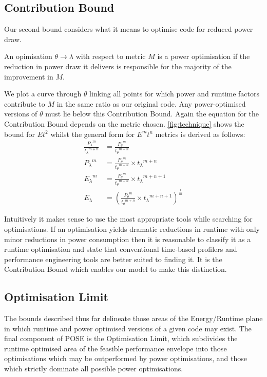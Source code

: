 \subsection{Contribution Bound}
Our second bound considers what it means to optimise code for reduced power draw.

\begin{definition}
An opimisation $\theta \to \lambda$ with respect to metric $M$ is a power optimisation if the reduction in power draw it delivers is responsible for the majority of the improvement in $M$. 
\end{definition}

We plot a curve through $\theta$ linking all points for which power and runtime factors contribute to $M$ in the same ratio as our original code.
Any power-optimised versions of $\theta$ must lie below this Contribution Bound.
Again the equation for the Contribution Bound depends on the metric chosen. 
\autoref{fig:technique} shows the bound for $Et^2$ whilst the general form for $E^mt^n$ metrics is derived as follows:
\begin{align}
\frac{{P_{\lambda}}^m}{{t_{\lambda}}^{m+n}} &= \frac{{P_{\theta}}^m}{{t_{\theta}}^{m+n}} \nonumber \\
 {P_{\lambda}}^m &= \frac{{P_{\theta}}^m}{{t_{\theta}}^{m+n}} \times {t_\lambda}^{m+n} \nonumber \\ 
 {E_{\lambda}}^m &= \frac{{P_{\theta}}^m}{{t_{\theta}}^{m+n}} \times {t_\lambda}^{m+n+1} \nonumber \\ 
  E_{\lambda} &= (\frac{{P_{\theta}}^m}{{t_{\theta}}^{m+n}} \times {t_\lambda}^{m+n+1})^{\frac{1}{m}} 
\end{align}

Intuitively it makes sense to use the most appropriate tools while searching for optimisations.
If an optimisation yields dramatic reductions in runtime with only minor reductions in power consumption then it is reasonable to classify it as a runtime optimisation and state that conventional time-based profilers and performance engineering tools are better suited to finding it.
It is the Contribution Bound which enables our model to make this distinction.
\subsection{Optimisation Limit}
The bounds described thus far delineate those areas of the Energy/Runtime plane in which runtime and power optimised versions of a given code may exist.
The final component of POSE is the Optimisation Limit, which subdivides the runtime optimised area of the feasible performance envelope into those optimisations which may be outperformed by power optimisations, and those which strictly dominate all possible power optimisations.


